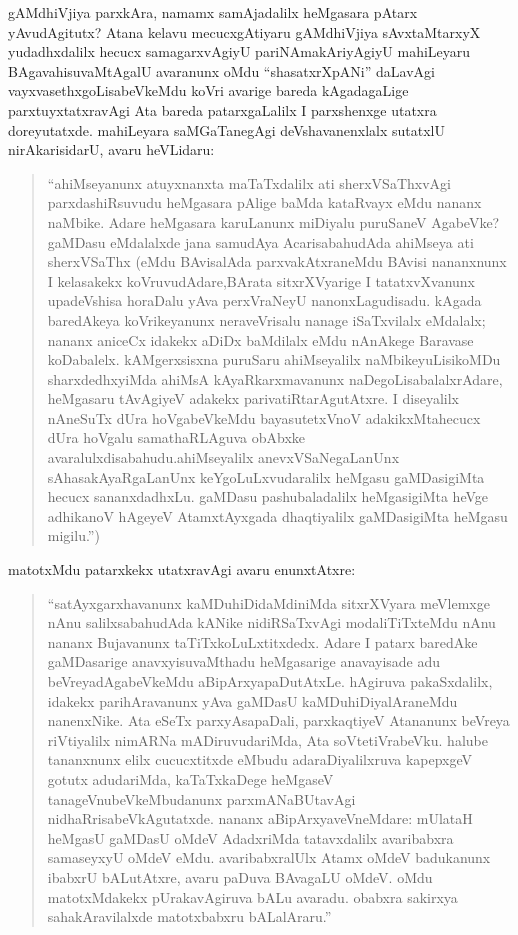 gAMdhiVjiya parxkAra, namamx samAjadalilx heMgasara pAtarx yAvudAgitutx? Atana kelavu mecucxgAtiyaru gAMdhiVjiya sAvxtaMtarxyX yudadhxdalilx hecucx samagarxvAgiyU pariNAmakAriyAgiyU mahiLeyaru BAgavahisuvaMtAgalU avaranunx oMdu ``shasatxrXpANi'' daLavAgi vayxvasethxgoLisabeVkeMdu koVri avarige bareda kAgadagaLige parxtuyxtatxravAgi Ata bareda patarxgaLalilx I parxshenxge utatxra doreyutatxde. mahiLeyara saMGaTanegAgi deVshavanenxlalx sutatxlU nirAkarisidarU, avaru heVLidaru:
\begin{quote}
``ahiMseyanunx atuyxnanxta maTaTxdalilx ati sherxVSaThxvAgi parxdashiRsuvudu heMgasara pAlige baMda kataRvayx eMdu nananx naMbike. Adare heMga\-sara karuLanunx miDiyalu puruSaneV AgabeVke? gaMDasu eMdalalxde jana samudAya AcarisabahudAda ahiMseya ati sherxVSaThx (eMdu BAvisa\-lAda parxvakAtxraneMdu BAvisi nananxnunx I kelasakekx koVruvu\-dAdare,\break BArata sitxrXVyarige I tatatxvXvanunx upadeVshisa horaDalu yAva perxVra\-NeyU nanonxLagudisadu. kAgada baredAkeya koVrikeyanunx nera\-veVrisalu nanage iSaTxvilalx eMdalalx; nananx aniceCx idakekx aDiDx \hbox{baMdilalx} eMdu nAnAkege Baravase koDabalelx. kAMgerxsisxna puruSaru ahiMseyalilx naMbikeyuLisikoMDu sharxdedhxyiMda ahiMsA kAyaRkarxmavanunx naDe\-goLisabalalxrAdare, heMgasaru tAvAgiyeV adakekx parivatiRtarAgutAtxre. I diseyalilx nAneSuTx dUra hoVgabeVkeMdu bayasutetxVnoV adakikxMta\break hecucx dUra hoVgalu samathaRLAguva obAbxke avaralulxdisabahudu.\break ahiMseyalilx anevxVSaNegaLanUnx sAhasakAyaRgaLanUnx keYgoLuLxvuda\break\-ralilx heMgasu gaMDasigiMta hecucx sananxdadhxLu. gaMDasu pashubaladalilx heMgasi\-giMta heVge adhikanoV hAgeyeV AtamxtAyxgada dhaqtiyalilx gaMDasigiMta heMgasu migilu.'')
\end{quote}

matotxMdu patarxkekx utatxravAgi avaru enunxtAtxre:
\begin{quote}
``satAyxgarxhavanunx kaMDuhiDidaMdiniMda sitxrXVyara meVlemxge nAnu salilxsa\-bahudAda kANike nidiRSaTxvAgi modaliTiTxteMdu nAnu nananx Buja\-vanunx taTiTxkoLuLxtitxdedx. Adare I patarx baredAke gaMDasarige anavxyisuvaMthadu heMgasarige anavayisade adu beVreyadAgabeVkeMdu aBipArxyapaDu\-tAtxLe. hAgiruva pakaSxdalilx, idakekx parihAravanunx yAva gaMDasU kaMDu\-hiDiyalAraneMdu nanenxNike. Ata eSeTx parxyAsapaDali, parxkaqtiyeV Ata\-nanunx beVreya riVtiyalilx nimARNa mADiruvudariMda, Ata soVte\-tiVrabeVku. halube tananxnunx elilx cucucxtitxde eMbudu adaraDiyalilxruva kapepxgeV gotutx adudariMda, kaTaTxkaDege heMgaseV tanageVnubeVkeMbudanunx parxmANaBUtavAgi nidhaRrisabeVkAgutatxde. nananx aBipArxyaveVneMdare: mUlataH heMgasU gaMDasU oMdeV AdadxriMda tatavxdalilx avaribabxra samaseyxyU oMdeV eMdu. avaribabxralUlx Atamx oMdeV badukanunx ibabxrU bALutAtxre, avaru paDuva BAvagaLU oMdeV. oMdu matotxM\-dakekx pUrakavAgiruva bALu avaradu. obabxra sakirxya sahakAravilalxde matotxbabxru bALalAraru.''
\end{quote}

